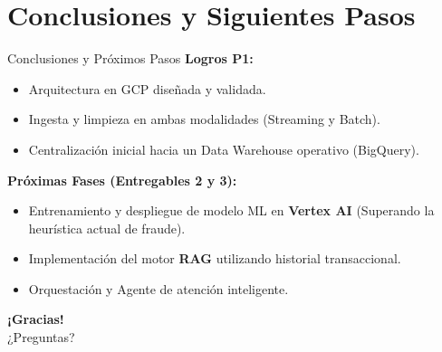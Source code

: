 \documentclass[aspectratio=169, xcolor=table]{beamer}
\begin{document}
\section{Conclusiones y Siguientes Pasos}

\begin{frame}{Conclusiones y Próximos Pasos}
    \textbf{Logros P1:}
    \begin{itemize}
        \item Arquitectura en GCP diseñada y validada.
        \item Ingesta y limpieza en ambas modalidades (Streaming y Batch).
        \item Centralización inicial hacia un Data Warehouse operativo (BigQuery).
    \end{itemize}
    
    \vspace{0.5cm}
    \textbf{Próximas Fases (Entregables 2 y 3):}
    \begin{itemize}
        \item Entrenamiento y despliegue de modelo ML en \textbf{Vertex AI} (Superando la heurística actual de fraude).
        \item Implementación del motor \textbf{RAG} utilizando historial transaccional.
        \item Orquestación y Agente de atención inteligente.
    \end{itemize}
\end{frame}

\begin{frame}
    \begin{center}
        \huge \textbf{¡Gracias!} \\
        \medskip
        \large ¿Preguntas?
    \end{center}
\end{frame}
\end{document}
